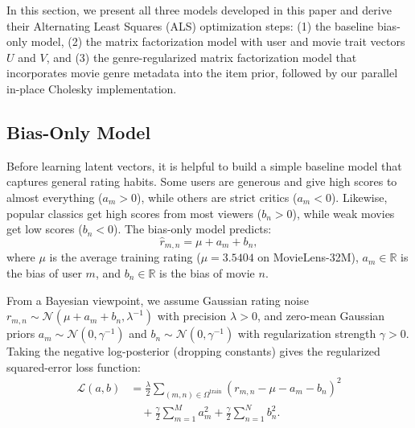\documentclass{article}
\theoremstyle{plain}
\theoremstyle{definition}
\begin{document}
In this section, we present all three models developed in this paper and derive their Alternating Least Squares (ALS) optimization steps: (1) the baseline bias-only model, (2) the matrix factorization model with user and movie trait vectors $U$ and $V$, and (3) the genre-regularized matrix factorization model that incorporates movie genre metadata into the item prior, followed by our parallel in-place Cholesky implementation.

\subsection{Bias-Only Model}
\label{sec:bias_model_sub}

Before learning latent vectors, it is helpful to build a simple baseline model that captures general rating habits. Some users are generous and give high scores to almost everything ($a_m > 0$), while others are strict critics ($a_m < 0$). Likewise, popular classics get high scores from most viewers ($b_n > 0$), while weak movies get low scores ($b_n < 0$). The bias-only model predicts:
\begin{equation}
    \hat{r}_{m,n} = \mu + a_m + b_n,
    \label{eq:bias_model_pred}
\end{equation}
where $\mu$ is the average training rating ($\mu = 3.5404$ on MovieLens-32M), $a_m \in \mathbb{R}$ is the bias of user $m$, and $b_n \in \mathbb{R}$ is the bias of movie $n$.

From a Bayesian viewpoint, we assume Gaussian rating noise $r_{m,n} \sim \mathcal{N}(\mu + a_m + b_n, \lambda^{-1})$ with precision $\lambda > 0$, and zero-mean Gaussian priors $a_m \sim \mathcal{N}(0, \gamma^{-1})$ and $b_n \sim \mathcal{N}(0, \gamma^{-1})$ with regularization strength $\gamma > 0$. Taking the negative log-posterior (dropping constants) gives the regularized squared-error loss function:
\begin{align}
    \mathcal{L}(a, b) &= \frac{\lambda}{2} \sum_{(m,n) \in \Omega^{\text{train}}} \left(r_{m,n} - \mu - a_m - b_n\right)^2 \nonumber \\
    &\quad + \frac{\gamma}{2} \sum_{m=1}^M a_m^2 + \frac{\gamma}{2} \sum_{n=1}^N b_n^2.
    \label{eq:bias_objective}
\end{align}
\end{document}

